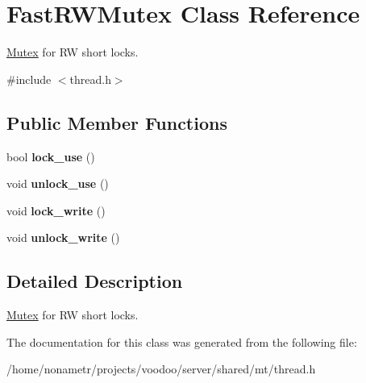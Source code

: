 \hypertarget{classFastRWMutex}{\section{\-Fast\-R\-W\-Mutex \-Class \-Reference}
\label{classFastRWMutex}
}


\hyperlink{classMutex}{\-Mutex} for \-R\-W short locks.  




{\ttfamily \#include $<$thread.\-h$>$}

\subsection*{\-Public \-Member \-Functions}
\begin{DoxyCompactItemize}
\item 
\hypertarget{classFastRWMutex_ab91b5738559b63f029db52be1f5bf41d}{bool {\bfseries lock\-\_\-use} ()}\label{classFastRWMutex_ab91b5738559b63f029db52be1f5bf41d}

\item 
\hypertarget{classFastRWMutex_ab7a03a1285ab2be407b7946425a50b4f}{void {\bfseries unlock\-\_\-use} ()}\label{classFastRWMutex_ab7a03a1285ab2be407b7946425a50b4f}

\item 
\hypertarget{classFastRWMutex_a6c5a991a310c5c04249a1c64cab0b89e}{void {\bfseries lock\-\_\-write} ()}\label{classFastRWMutex_a6c5a991a310c5c04249a1c64cab0b89e}

\item 
\hypertarget{classFastRWMutex_a34fa54965c5af6e398468d20ed97aa2e}{void {\bfseries unlock\-\_\-write} ()}\label{classFastRWMutex_a34fa54965c5af6e398468d20ed97aa2e}

\end{DoxyCompactItemize}


\subsection{\-Detailed \-Description}
\hyperlink{classMutex}{\-Mutex} for \-R\-W short locks. 

\-The documentation for this class was generated from the following file\-:\begin{DoxyCompactItemize}
\item 
/home/nonametr/projects/voodoo/server/shared/mt/thread.\-h\end{DoxyCompactItemize}
